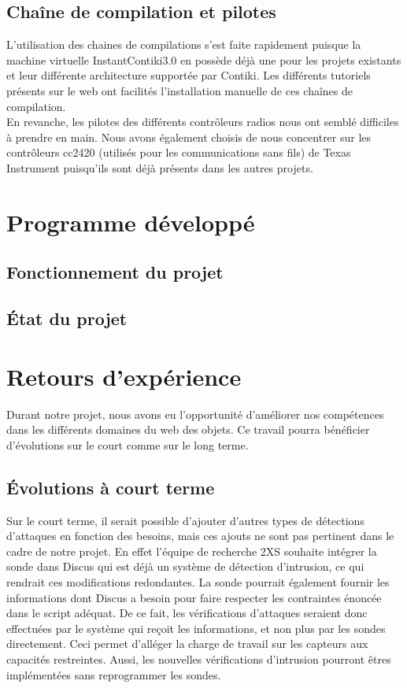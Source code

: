	\subsection{Chaîne de compilation et pilotes}
	L'utilisation des chaines de compilations s'est faite rapidement puisque la machine virtuelle InstantContiki3.0 en possède déjà une pour les projets existants et leur différente architecture supportée par Contiki. Les différents tutoriels présents sur le web ont facilités l'installation manuelle de ces chaînes de compilation.\\
	En revanche, les pilotes des différents contrôleurs radios nous ont semblé difficiles à prendre en main. Nous avons également choisis de nous concentrer sur les contrôleurs cc2420 (utilisés pour les communications sans fils) de Texas Instrument puisqu'ils sont déjà présents dans les autres projets.

\section{Programme développé}
	\subsection{Fonctionnement du projet}
	\subsection{État du projet}

\section{Retours d'expérience} %
    Durant notre projet, nous avons eu l'opportunité d'améliorer nos compétences dans les différents domaines du web des objets. Ce travail pourra bénéficier d'évolutions sur le court comme sur le long terme.
    
	\subsection{Évolutions à court terme} %
	Sur le court terme, il serait possible d'ajouter d'autres types de détections d'attaques en fonction des besoins, mais ces ajouts ne sont pas pertinent dans le cadre de notre projet. En effet l'équipe de recherche 2XS souhaite intégrer la sonde dans Discus qui est déjà un système de détection d'intrusion, ce qui rendrait ces modifications redondantes.
	La sonde pourrait également fournir les informations dont Discus a besoin pour faire respecter les contraintes énoncée dans le script adéquat. 
	De ce fait, les vérifications d'attaques seraient donc effectuées par le système qui reçoit les informations, et non plus par les sondes directement. Ceci permet d'alléger la charge de travail sur les capteurs aux capacités restreintes. Aussi, les nouvelles vérifications d'intrusion pourront êtres implémentées sans reprogrammer les sondes.
